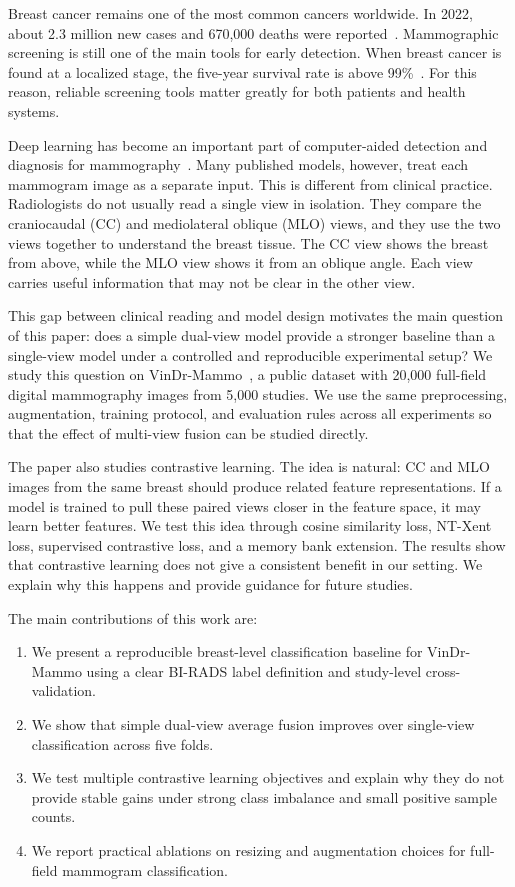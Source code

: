 \documentclass[runningheads]{llncs}
\begin{document}
Breast cancer remains one of the most common cancers worldwide. In 2022, about 2.3 million new cases and 670,000 deaths were reported~\cite{iarc2022breast}. Mammographic screening is still one of the main tools for early detection. When breast cancer is found at a localized stage, the five-year survival rate is above 99\%~\cite{seer2024breast}. For this reason, reliable screening tools matter greatly for both patients and health systems.

Deep learning has become an important part of computer-aided detection and diagnosis for mammography~\cite{andreadis2025cad}. Many published models, however, treat each mammogram image as a separate input. This is different from clinical practice. Radiologists do not usually read a single view in isolation. They compare the craniocaudal (CC) and mediolateral oblique (MLO) views, and they use the two views together to understand the breast tissue. The CC view shows the breast from above, while the MLO view shows it from an oblique angle. Each view carries useful information that may not be clear in the other view.

This gap between clinical reading and model design motivates the main question of this paper: does a simple dual-view model provide a stronger baseline than a single-view model under a controlled and reproducible experimental setup? We study this question on VinDr-Mammo~\cite{nguyen2023vindr}, a public dataset with 20,000 full-field digital mammography images from 5,000 studies. We use the same preprocessing, augmentation, training protocol, and evaluation rules across all experiments so that the effect of multi-view fusion can be studied directly.

The paper also studies contrastive learning. The idea is natural: CC and MLO images from the same breast should produce related feature representations. If a model is trained to pull these paired views closer in the feature space, it may learn better features. We test this idea through cosine similarity loss, NT-Xent loss, supervised contrastive loss, and a memory bank extension. The results show that contrastive learning does not give a consistent benefit in our setting. We explain why this happens and provide guidance for future studies.

The main contributions of this work are:
\begin{enumerate}
    \item We present a reproducible breast-level classification baseline for VinDr-Mammo using a clear BI-RADS label definition and study-level cross-validation.
    \item We show that simple dual-view average fusion improves over single-view classification across five folds.
    \item We test multiple contrastive learning objectives and explain why they do not provide stable gains under strong class imbalance and small positive sample counts.
    \item We report practical ablations on resizing and augmentation choices for full-field mammogram classification.
\end{enumerate}
\end{document}
